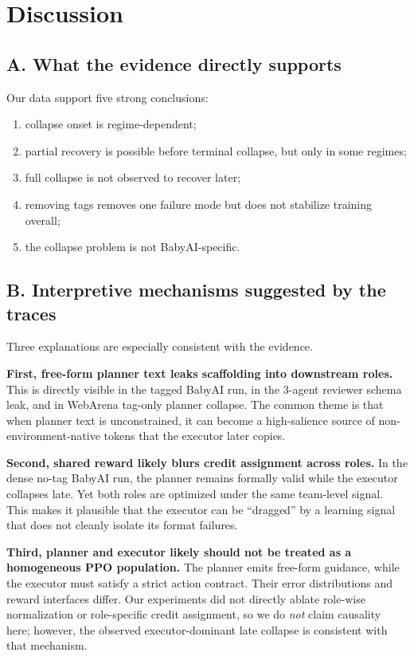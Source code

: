 \documentclass{ieeeaccess}
\begin{document}
\FloatBarrier

\section{Discussion}
\subsection{A. What the evidence directly supports}
Our data support five strong conclusions:
\begin{enumerate}
\item collapse onset is regime-dependent;
\item partial recovery is possible before terminal collapse, but only in some regimes;
\item full collapse is not observed to recover later;
\item removing tags removes one failure mode but does not stabilize training overall;
\item the collapse problem is not BabyAI-specific.
\end{enumerate}

\subsection{B. Interpretive mechanisms suggested by the traces}
Three explanations are especially consistent with the evidence.

\textbf{First, free-form planner text leaks scaffolding into downstream roles.} This is directly visible in the tagged BabyAI run, in the 3-agent reviewer schema leak, and in WebArena tag-only planner collapse. The common theme is that when planner text is unconstrained, it can become a high-salience source of non-environment-native tokens that the executor later copies.

\textbf{Second, shared reward likely blurs credit assignment across roles.} In the dense no-tag BabyAI run, the planner remains formally valid while the executor collapses late. Yet both roles are optimized under the same team-level signal. This makes it plausible that the executor can be ``dragged'' by a learning signal that does not cleanly isolate its format failures.

\textbf{Third, planner and executor likely should not be treated as a homogeneous PPO population.} The planner emits free-form guidance, while the executor must satisfy a strict action contract. Their error distributions and reward interfaces differ. Our experiments did not directly ablate role-wise normalization or role-specific credit assignment, so we do \emph{not} claim causality here; however, the observed executor-dominant late collapse is consistent with that mechanism.
\end{document}
